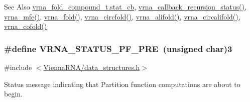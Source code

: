 \begin{DoxySeeAlso}{See Also}
\hyperlink{group__fold__compound_a87a83f6795b569000efcbe65acc3dd81}{vrna\-\_\-fold\-\_\-compound\-\_\-t.\-stat\-\_\-cb}, \hyperlink{group__fold__compound_ga9fafb3f0217e27339bb9faf61a03e723}{vrna\-\_\-callback\-\_\-recursion\-\_\-status()}, \hyperlink{group__mfe__fold_gabd3b147371ccf25c577f88bbbaf159fd}{vrna\-\_\-mfe()}, \hyperlink{group__mfe__fold__single_gae7ca49ffb3086f145da36c964a7cec64}{vrna\-\_\-fold()}, \hyperlink{group__mfe__fold__single_gaa0f5bf321038f404b36a6147bdae4154}{vrna\-\_\-circfold()}, \hyperlink{group__consensus__mfe__fold_ga02098d0c8790f9a37fbef6ad0cfc705c}{vrna\-\_\-alifold()}, \hyperlink{group__consensus__mfe__fold_ga01ce2cff93ea44c4f4254760ca2bd16c}{vrna\-\_\-circalifold()}, \hyperlink{group__mfe__cofold_ga45515db181f17653ef7ef5487ef36d08}{vrna\-\_\-cofold()} 
\end{DoxySeeAlso}
\hypertarget{group__fold__compound_ga91795d35ebdb6f32be50459f24b3d114}{
\subsubsection[{V\-R\-N\-A\-\_\-\-S\-T\-A\-T\-U\-S\-\_\-\-P\-F\-\_\-\-P\-R\-E}]{\setlength{\rightskip}{0pt plus 5cm}\#define V\-R\-N\-A\-\_\-\-S\-T\-A\-T\-U\-S\-\_\-\-P\-F\-\_\-\-P\-R\-E~(unsigned char)3}}\label{group__fold__compound_ga91795d35ebdb6f32be50459f24b3d114}


{\ttfamily \#include $<$\hyperlink{data__structures_8h}{Vienna\-R\-N\-A/data\-\_\-structures.\-h}$>$}



Status message indicating that Partition function computations are about to begin. 

